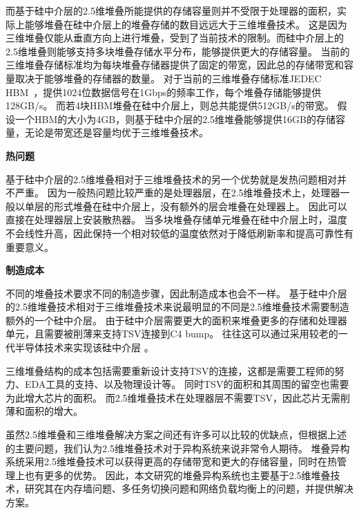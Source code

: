 而基于硅中介层的2.5维堆叠所能提供的存储容量则并不受限于处理器的面积，实际上能够堆叠在硅中介层上的堆叠存储的数目远远大于三维堆叠技术。
这是因为三维堆叠仅能从垂直方向上进行堆叠，受到了当前技术的限制。而硅中介层上的2.5维堆叠则能够支持多块堆叠存储水平分布，能够提供更大的存储容量。
当前的三维堆叠存储标准均为每块堆叠存储器提供了固定的带宽，因此总的存储带宽和容量取决于能够堆叠的存储器的数量。
对于当前的三维堆叠存储标准JEDEC HBM~，提供1024位数据信号在1Gbps的频率工作，每个堆叠存储能够提供128GB/s。 
而若4块HBM堆叠在硅中介层上，则总共能提供512GB/s的带宽。
假设一个HBM的大小为4GB，则基于硅中介层的2.5维堆叠能够提供16GB的存储容量，无论是带宽还是容量均优于三维堆叠技术。

\textbf{热问题}

基于硅中介层的2.5维堆叠相对于三维堆叠技术的另一个优势就是发热问题相对并不严重。
因为一般热问题比较严重的是处理器层，在2.5维堆叠技术上，处理器一般以单层的形式堆叠在硅中介层上，没有额外的层会堆叠在处理器上。
因此可以直接在处理器层上安装散热器。
当多块堆叠存储单元堆叠在硅中介层上时，温度不会线性升高，因此保持一个相对较低的温度依然对于降低刷新率和提高可靠性有重要意义。

\textbf{制造成本}

不同的堆叠技术要求不同的制造步骤，因此制造成本也会不一样。
基于硅中介层的2.5维堆叠技术相对于三维堆叠技术来说最明显的不同是2.5维堆叠技术需要制造额外的一个硅中介层。
由于硅中介层需要更大的面积来堆叠更多的存储和处理器单元，且需要被削薄来支持TSV连接到C4 bump。
往往这可以通过采用较老的一代半导体技术来实现该硅中介层
。

三维堆叠结构的成本包括需要重新设计支持TSV的连接，这都是需要工程师的努力、EDA工具的支持、以及物理设计等。
同时TSV的面积和其周围的留空也需要为此增大芯片的面积。
而2.5维堆叠技术在处理器层不需要TSV，因此芯片无需削薄和面积的增大。

虽然2.5维堆叠和三维堆叠解决方案之间还有许多可以比较的优缺点，但根据上述的主要问题，我们认为2.5维堆叠技术对于异构系统来说非常令人期待。
堆叠异构系统采用2.5维堆叠技术可以获得更高的存储带宽和更大的存储容量，同时在热管理上也有更多的优势。
因此，本文研究的堆叠异构系统也主要基于2.5维堆叠技术，研究其在内存墙问题、多任务切换问题和网络负载均衡上的问题，并提供解决方案。

